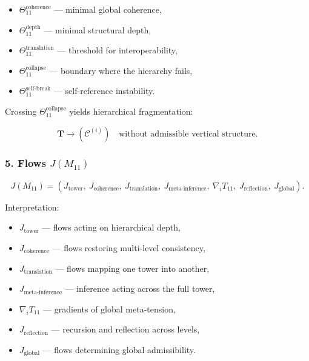 \begin{itemize}
    \item $\Theta_{11}^{\mathrm{coherence}}$ — minimal global coherence,
    \item $\Theta_{11}^{\mathrm{depth}}$ — minimal structural depth,
    \item $\Theta_{11}^{\mathrm{translation}}$ — threshold for interoperability,
    \item $\Theta_{11}^{\mathrm{collapse}}$ — boundary where the hierarchy fails,
    \item $\Theta_{11}^{\mathrm{self\mbox{-}break}}$ — self-reference instability.
\end{itemize}

Crossing $\Theta_{11}^{\mathrm{collapse}}$ yields hierarchical fragmentation:

\[
\mathbf{T} \to (\mathcal{C}^{(i)}) \quad \text{without admissible vertical structure}.
\]

\subsubsection*{5. Flows $J(M_{11})$}

\[
J(M_{11}) =
(
J_{\mathrm{tower}},\
J_{\mathrm{coherence}},\
J_{\mathrm{translation}},\
J_{\mathrm{meta\mbox{-}inference}},\
\nabla_i T_{11},\
J_{\mathrm{reflection}},\
J_{\mathrm{global}}
).
\]

Interpretation:

\begin{itemize}
    \item $J_{\mathrm{tower}}$ — flows acting on hierarchical depth,
    \item $J_{\mathrm{coherence}}$ — flows restoring multi-level consistency,
    \item $J_{\mathrm{translation}}$ — flows mapping one tower into another,
    \item $J_{\mathrm{meta\mbox{-}inference}}$ — inference acting across the full tower,
    \item $\nabla_i T_{11}$ — gradients of global meta-tension,
    \item $J_{\mathrm{reflection}}$ — recursion and reflection across levels,
    \item $J_{\mathrm{global}}$ — flows determining global admissibility.
\end{itemize}

